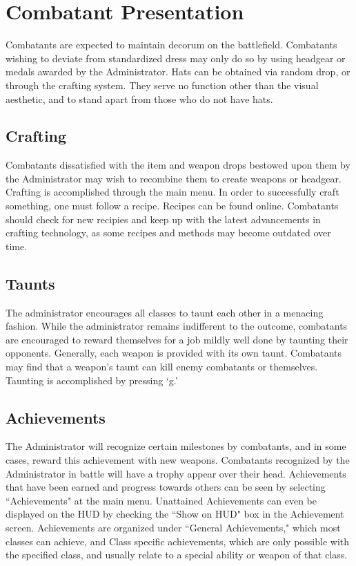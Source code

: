 \section{Combatant Presentation}
Combatants are expected to maintain decorum on the battlefield.  Combatants wishing to deviate from standardized dress may only do so by using headgear or medals awarded by the Administrator. Hats can be obtained via random drop, or through the crafting system. They serve no function other than the visual aesthetic, and to stand apart from those who do not have hats.

\subsection{Crafting}
Combatants dissatisfied with the item and weapon drops bestowed upon them by the Administrator may wish to recombine them to create weapons or headgear.  Crafting is accomplished through the main menu.  In order to successfully craft something, one must follow a recipe.  Recipes can be found online. Combatants should check for new recipies and keep up with the latest advancements in crafting technology, as some recipes and methods may become outdated over time. 

\subsection{Taunts}
The administrator encourages all classes to taunt each other in a menacing fashion. While the administrator remains indifferent to the outcome, combatants are encouraged to reward themselves for a job mildly well done by taunting their opponents. Generally, each weapon is provided with its own taunt. Combatants may find that a weapon's taunt can kill enemy combatants or themselves.  Taunting is accomplished by pressing `g.'
 
\subsection{Achievements}
\label{Achievements}
The Administrator will recognize certain milestones by combatants, and in some cases, reward this achievement with new weapons. Combatants recognized by the Administrator in battle will have a trophy appear over their head. Achievements that have been earned and progress towards others can be seen by selecting ``Achievements" at the main menu. Unattained Achievements can even be displayed on the HUD by checking the ``Show on HUD" box in the Achievement screen.  Achievements are organized under ``General Achievements," which most classes can achieve, and Class specific achievements, which are only possible with the specified class, and usually relate to a special ability or weapon of that class.